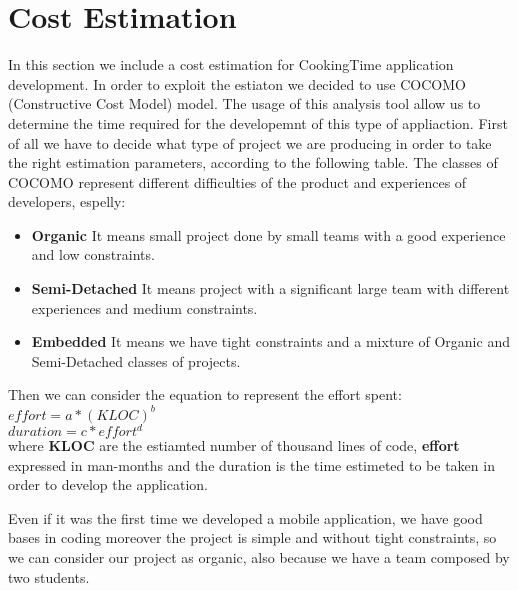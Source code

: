\chapter{Cost Estimation}
In this section we include a cost estimation for CookingTime application development. In order to exploit the estiaton we decided to use COCOMO (Constructive Cost Model) model. The usage of this analysis tool allow us to determine the time required for the developemnt of this type of appliaction.
First of all we have to decide what type of project we are producing in order to take the right estimation parameters, according to the following table.
The classes of COCOMO represent different difficulties of the product and experiences of developers, espelly:
\begin{itemize}
	\item \textbf{Organic} It means small project done by small teams with a good experience and low constraints.
	\item \textbf{Semi-Detached} It means project with a significant large team with different experiences and medium constraints.
	\item \textbf{Embedded} It means we have tight constraints and a mixture of Organic and Semi-Detached classes of projects.
\end{itemize}
Then we can consider the equation to represent the effort spent:\\
$ effort = a * (KLOC)^{b}$\\
$ duration = c * effort^{d}$\\
where \textbf{KLOC} are the estiamted number of thousand lines of code, \textbf{effort} expressed in man-months and the duration is the time estimeted to be taken in order to develop the application.

Even if it was the first time we developed a mobile application, we have good bases in coding moreover the project is simple and without tight constraints, so we can consider our project as organic, also because we have a team composed by two students.


